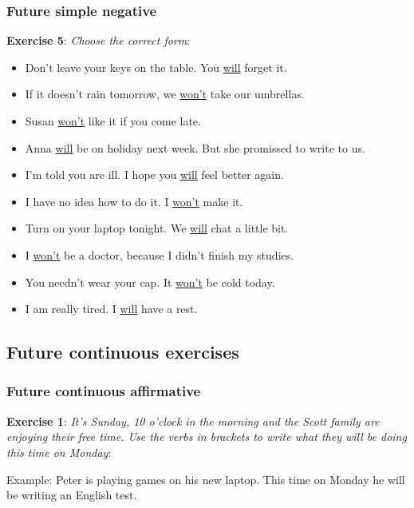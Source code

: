 \subsubsection{Future simple negative}

\textbf{Exercise 5}: \textit{Choose the correct form}:

\begin{itemize}

\item Don't leave your keys on the table. You \underline{will} forget it.
\item If it doesn't rain tomorrow, we \underline{won't} take our umbrellas.
\item Susan \underline{won't} like it if you come late.
\item Anna \underline{will} be on holiday next week. But she promissed to write to us.
\item I'm told you are ill. I hope you \underline{will} feel better again.
\item I have no idea how to do it. I \underline{won't} make it.
\item Turn on your laptop tonight. We \underline{will} chat a little bit.
\item I \underline{won't} be a doctor, because I didn't finish my studies.
\item You needn't wear your cap. It \underline{won't} be cold today.
\item I am really tired. I \underline{will} have a rest.

\end{itemize}

\subsection{Future continuous exercises}

\subsubsection{Future continuous affirmative}

\textbf{Exercise 1}: \textit{It's Sunday, 10 o'clock in the morning and the Scott family are enjoying their free time. Use the verbs in brackets to write what they will be doing this time on Monday}:

Example:
Peter is playing games on his new laptop.
This time on Monday he will be writing an English test.

